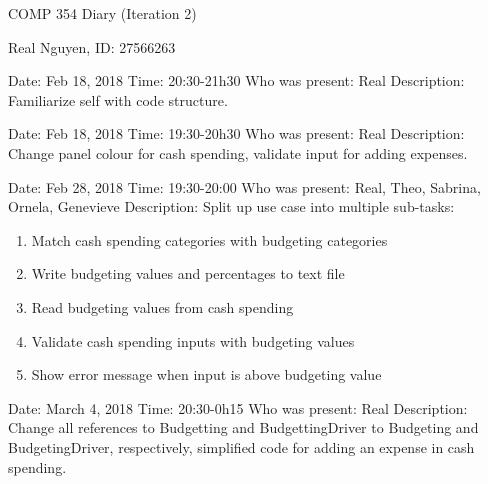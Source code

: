 \documentclass{article}
\begin{document}
 
\begin{center}
    COMP 354 Diary (Iteration 2)
\end{center}
 
\begin{center}
    Real Nguyen, ID: 27566263
\end{center}
 
\begin{flushleft}
Date: Feb 18, 2018 \newline
Time: 20:30-21h30 \newline
Who was present: Real\newline
Description: Familiarize self with code structure.\newline
\end{flushleft}
 
\begin{flushleft}
Date: Feb 18, 2018 \newline
Time: 19:30-20h30 \newline
Who was present: Real\newline
Description: Change panel colour for cash spending, validate input for adding expenses.\newline
\end{flushleft}
 
\begin{flushleft}
Date: Feb 28, 2018 \newline
Time: 19:30-20:00 \newline
Who was present: Real, Theo, Sabrina, Ornela, Genevieve\newline
Description: Split up use case into multiple sub-tasks:
\begin{enumerate}
  \item Match cash spending categories with budgeting categories
  \item Write budgeting values and percentages to text file
  \item Read budgeting values from cash spending
  \item Validate cash spending inputs with budgeting values
  \item Show error message when input is above budgeting value
\end{enumerate}
\end{flushleft}

\begin{flushleft}
Date: March 4, 2018 \newline
Time: 20:30-0h15 \newline
Who was present: Real\newline
Description: Change all references to Budgetting and BudgettingDriver to Budgeting and BudgetingDriver, respectively, simplified code for adding an expense in cash spending.\newline
\end{flushleft}
\end{document}
